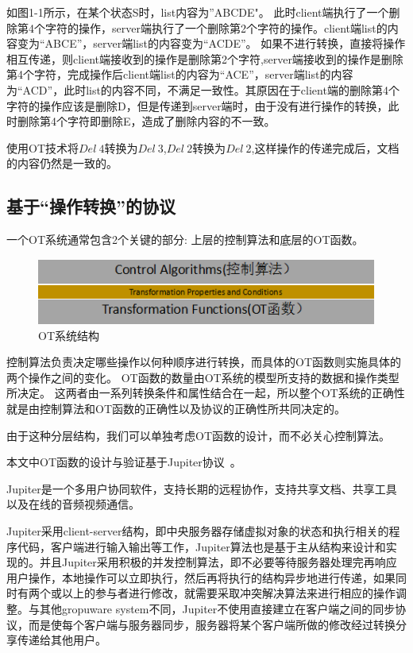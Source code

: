 如图1-1所示，在某个状态S时，list内容为”ABCDE"。
此时client端执行了一个删除第4个字符的操作，server端执行了一个删除第2个字符的操作。client端list的内容变为“ABCE”，server端list的内容变为“ACDE”。
如果不进行转换，直接将操作相互传递，则client端接收到的操作是删除第2个字符,server端接收到的操作是删除第4个字符，完成操作后client端list的内容为“ACE”，server端list的内容为“ACD”，此时list的内容不同，不满足一致性。其原因在于client端的删除第4个字符的操作应该是删除D，但是传递到server端时，由于没有进行操作的转换，此时删除第4个字符即删除E，造成了删除内容的不一致。

使用OT技术将$Del\ 4$转换为$Del\ 3$,$Del\ 2$转换为$Del\ 2$,这样操作的传递完成后，文档的内容仍然是一致的。

\subsection{基于``操作转换''的协议}
一个OT系统通常包含2个关键的部分: 上层的控制算法和底层的OT函数。

\begin{figure}[H]
\centering
\includegraphics{figures/structure.bmp}
\caption{OT系统结构}
\end{figure}

控制算法负责决定哪些操作以何种顺序进行转换，而具体的OT函数则实施具体的两个操作之间的变化。
OT函数的数量由OT系统的模型所支持的数据和操作类型所决定。
这两者由一系列转换条件和属性结合在一起，所以整个OT系统的正确性就是由控制算法和OT函数的正确性以及协议的正确性所共同决定的。

由于这种分层结构，我们可以单独考虑OT函数的设计，而不必关心控制算法。

本文中OT函数的设计与验证基于Jupiter协议~\cite{Nichols:UIST95}。

Jupiter是一个多用户协同软件，支持长期的远程协作，支持共享文档、共享工具以及在线的音频视频通信。

Jupiter采用client-server结构，即中央服务器存储虚拟对象的状态和执行相关的程序代码，客户端进行输入输出等工作，Jupiter算法也是基于主从结构来设计和实现的。并且Jupiter采用积极的并发控制算法，即不必要等待服务器处理完再响应用户操作，本地操作可以立即执行，然后再将执行的结构异步地进行传递，如果同时有两个或以上的参与者进行修改，就需要采取冲突解决算法来进行相应的操作调整。与其他gropuware system不同，Jupiter不使用直接建立在客户端之间的同步协议，而是使每个客户端与服务器同步，服务器将某个客户端所做的修改经过转换分享传递给其他用户。

